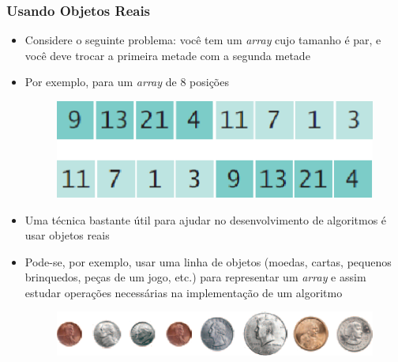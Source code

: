 \documentclass[xcolor={dvipsnames,table},aspectratio=169]{beamer}
\begin{document}
\begin{frame}\frametitle{Usando Objetos Reais}
\begin{itemize}
	\item Considere o seguinte problema: você tem um \emph{array} cujo tamanho é par, e você deve trocar a primeira metade com a segunda metade
	\item Por exemplo, para um \emph{array} de 8 posições
\begin{figure}[h]
	\includegraphics[height=0.15\paperheight,center]{pucrs-ep-fprog-unidade_06-arrays-laminas-troca_metades.png}
\end{figure}
	\item Uma técnica bastante útil para ajudar no desenvolvimento de algoritmos é usar objetos reais
	\item Pode-se, por exemplo, usar uma linha de objetos (moedas, cartas, pequenos brinquedos, peças de um jogo, etc.) para representar um \emph{array} e assim estudar operações necessárias na implementação de um algoritmo
\begin{figure}[h]
	\includegraphics[height=0.1\paperheight,center]{pucrs-ep-fprog-unidade_06-arrays-laminas-moedas.png}
\end{figure}
\end{itemize}
\end{frame}
\end{document}
